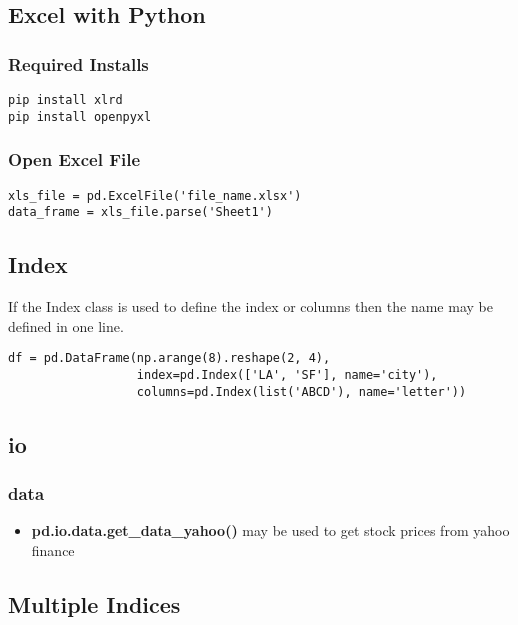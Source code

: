 \subsection{Excel with Python}

%
\subsubsection{Required Installs}
\begin{lstlisting}
pip install xlrd
pip install openpyxl
\end{lstlisting}

%
\subsubsection{Open Excel File}
\begin{lstlisting}
xls_file = pd.ExcelFile('file_name.xlsx')
data_frame = xls_file.parse('Sheet1')
\end{lstlisting}

\subsection{Index}
If the Index class is used to define the index or columns then the name may be
defined in one line.
\begin{lstlisting}
df = pd.DataFrame(np.arange(8).reshape(2, 4),
                  index=pd.Index(['LA', 'SF'], name='city'),
                  columns=pd.Index(list('ABCD'), name='letter'))
\end{lstlisting}

\subsection{io}

%
\subsubsection{data}
  \begin{itemize}

    \item \textbf{pd.io.data.get\_data\_yahoo()} may be used to get stock prices
      from yahoo finance
  \end{itemize}

%
\subsection{Multiple Indices}

